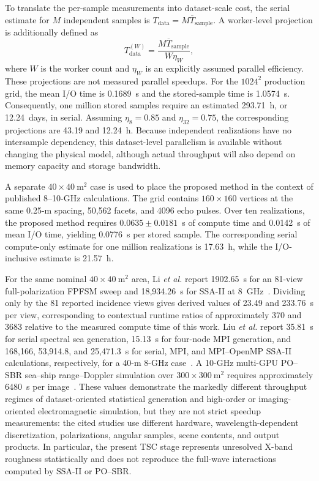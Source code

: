 To translate the per-sample measurements into dataset-scale cost, the serial estimate for $M$ independent samples is $T_{\mathrm{data}}=M\overline{T}_{\mathrm{sample}}$. A worker-level projection is additionally defined as
\begin{equation}
T_{\mathrm{data}}^{(W)}=\frac{M\overline{T}_{\mathrm{sample}}}{W\eta_W},
\label{eq:dataset_wall_time}
\end{equation}
where $W$ is the worker count and $\eta_W$ is an explicitly assumed parallel efficiency. These projections are not measured parallel speedups. For the $1024^2$ production grid, the mean I/O time is 0.1689~s and the stored-sample time is 1.0574~s. Consequently, one million stored samples require an estimated 293.71~h, or 12.24~days, in serial. Assuming $\eta_8=0.85$ and $\eta_{32}=0.75$, the corresponding projections are 43.19 and 12.24~h. Because independent realizations have no intersample dependency, this dataset-level parallelism is available without changing the physical model, although actual throughput will also depend on memory capacity and storage bandwidth.

A separate $40\times40~\mathrm{m}^2$ case is used to place the proposed method in the context of published 8--10-GHz calculations. The grid contains $160\times160$ vertices at the same 0.25-m spacing, 50,562 facets, and 4096 echo pulses. Over ten realizations, the proposed method requires $0.0635\pm0.0181$~s of compute time and 0.0142~s of mean I/O time, yielding 0.0776~s per stored sample. The corresponding serial compute-only estimate for one million realizations is 17.63~h, while the I/O-inclusive estimate is 21.57~h.

For the same nominal $40\times40~\mathrm{m}^2$ area, Li \emph{et al.} report 1902.65~s for an 81-view full-polarization FPFSM sweep and 18,934.26~s for SSA-II at 8~GHz~\cite{li2019fpfsm}. Dividing only by the 81 reported incidence views gives derived values of 23.49 and 233.76~s per view, corresponding to contextual runtime ratios of approximately 370 and 3683 relative to the measured compute time of this work. Liu \emph{et al.} report 35.81~s for serial spectral sea generation, 15.13~s for four-node MPI generation, and 168,166, 53,914.8, and 25,471.3~s for serial, MPI, and MPI--OpenMP SSA-II calculations, respectively, for a 40-m 8-GHz case~\cite{liu2026parallel}. A 10-GHz multi-GPU PO--SBR sea--ship range--Doppler simulation over $300\times300~\mathrm{m}^2$ requires approximately 6480~s per image~\cite{zhang2024gpu}. These values demonstrate the markedly different throughput regimes of dataset-oriented statistical generation and high-order or imaging-oriented electromagnetic simulation, but they are not strict speedup measurements: the cited studies use different hardware, wavelength-dependent discretization, polarizations, angular samples, scene contents, and output products. In particular, the present TSC stage represents unresolved X-band roughness statistically and does not reproduce the full-wave interactions computed by SSA-II or PO--SBR.

